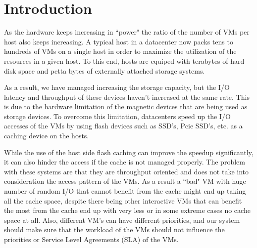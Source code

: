 
%
%

\section{Introduction}
As the hardware keeps increasing in ``power" the ratio of the number of VMs per host also keeps increasing. A typical host in a datacenter now packs tens to hundreds of VMs on a single host in order to maximize the utilization of the resources in a given host. To this end, hosts are equiped with terabytes of hard disk space and petta bytes of externally attached storage systems.

As a result, we have managed increasing the storage capacity, but the I/O latency and throughput of these devices haven't increased at the same rate. This is due to the hardware limitation of the magnetic devices that are being used as storage devices. To overcome this limitation, datacenters speed up the I/O accesses of the VMs by using flash devices such as SSD's, Pcie SSD's, etc. as a caching device on the hosts.

While the use of the host side flash caching can improve the speedup significantly, it can also hinder the access if the cache is not managed properly. The problem with these systems are that they are throughput oriented and does not take into consideration the access pattern of the VMs. As a result a ``bad" VM with huge number of random I/O that cannot benefit from the cache might end up taking all the cache space, despite there being other interactive VMs that can benefit the most from the cache end up with very less or in some extreme cases no cache space at all. Also, different VM's can have different priorities, and our system should make sure that the workload of the VMs should not influence the priorities or Service Level Agreements (SLA) of the VMs.

